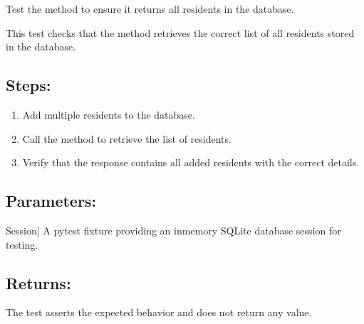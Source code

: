 \documentclass[letterpaper,10pt,english]{sphinxmanual}
\begin{document}
\begin{fulllineitems}
\label{\detokenize{test:test.test_residetnt.test_list_residents}}
\pysigstartsignatures
\pysiglinewithargsret
{}
{}
{}
\pysigstopsignatures
\sphinxAtStartPar
Test the  method to ensure it returns all residents in the database.

\sphinxAtStartPar
This test checks that the method retrieves the correct list of all residents
stored in the database.


\subsection{Steps:}
\label{\detokenize{test:steps}}\begin{enumerate}
%
\item {} 
\sphinxAtStartPar
Add multiple residents to the database.

\item {} 
\sphinxAtStartPar
Call the  method to retrieve the list of residents.

\item {} 
\sphinxAtStartPar
Verify that the response contains all added residents with the correct details.

\end{enumerate}


\subsection{Parameters:}
\label{\detokenize{test:id9}}\begin{description}
\sphinxlineitem{setup\_database}{[}Session{]}
\sphinxAtStartPar
A pytest fixture providing an in\sphinxhyphen{}memory SQLite database session for testing.

\end{description}


\subsection{Returns:}
\label{\detokenize{test:id10}}\begin{description}
\sphinxAtStartPar
The test asserts the expected behavior and does not return any value.

\end{description}

\end{fulllineitems}
\end{document}
